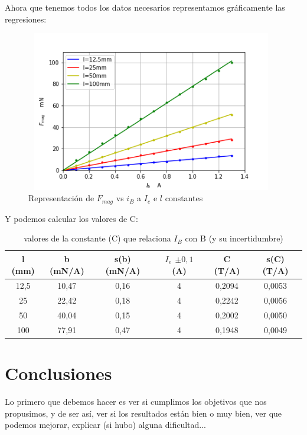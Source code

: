 \documentclass[12pt,a4paper]{book}
\begin{document}
Ahora que tenemos todos los datos necesarios representamos gráficamente las regresiones:

\begin{figure}[h!] %
\centering
\includegraphics[width=11cm, height=7cm]{plot3-balanzaelectrodinamica.png}
\caption{Representación de $F_{mag}$ vs $i_B$ a $I_e$ e $l$ constantes}
\label{fig:Plot3-balanzaelectrodinamica}
\end{figure}


Y podemos calcular los valores de C:


\begin{table}[h!]
\begin{center}
\begin{tabular}{|c|c|c|c|c|c|}
\hline
l  (mm) & 	 b  (mN/A) & 	 s(b) (mN/A) & 	 $I_e$  $\pm 0,1$   (A) & 	 C (T/A) & 	 s(C) (T/A) \\ \hline
12,5 & 	 10,47 & 	 0,16 & 	 4 & 	 0,2094 & 	 0,0053 \\ 
25 & 	 22,42 & 	 0,18 & 	 4 & 	 0,2242 & 	 0,0056 \\ 
50 & 	 40,04 & 	 0,15 & 	 4 & 	 0,2002 & 	 0,0050 \\ 
100 & 	 77,91 & 	 0,47 & 	 4 & 	 0,1948 & 	 0,0049 \\ 
\hline
\end{tabular}
\caption{valores de la constante (C) que relaciona $I_B$ con B (y su incertidumbre)}
\label{Tab:balanza-valor-cte-Ib}
\end{center}
\end{table}

\newpage

\section{Conclusiones}

Lo primero que debemos hacer es ver si cumplimos los objetivos que nos propusimos, y de ser así, ver si los resultados están bien o muy bien, ver que podemos mejorar, explicar (si hubo) alguna dificultad... \\
\end{document}
